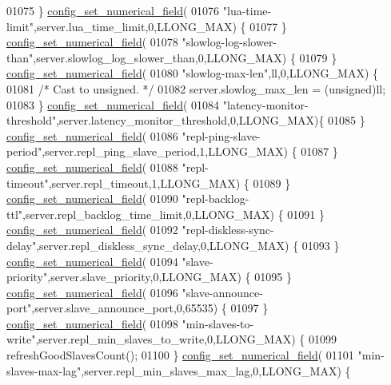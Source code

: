 \begin{DoxyCode}
{{{{{{{{01075     \} \hyperlink{config_8c_aba8f21b37a3e47952951cf4bd15ad296}{config\_set\_numerical\_field}(
01076       \textcolor{stringliteral}{"lua-time-limit"},server.lua\_time\_limit,0,LLONG\_MAX) \{
01077     \} \hyperlink{config_8c_aba8f21b37a3e47952951cf4bd15ad296}{config\_set\_numerical\_field}(
01078       \textcolor{stringliteral}{"slowlog-log-slower-than"},server.slowlog\_log\_slower\_than,0,LLONG\_MAX) \{
01079     \} \hyperlink{config_8c_aba8f21b37a3e47952951cf4bd15ad296}{config\_set\_numerical\_field}(
01080       \textcolor{stringliteral}{"slowlog-max-len"},ll,0,LLONG\_MAX) \{
01081       \textcolor{comment}{/* Cast to unsigned. */}
01082         server.slowlog\_max\_len = (\textcolor{keywordtype}{unsigned})ll;
01083     \} \hyperlink{config_8c_aba8f21b37a3e47952951cf4bd15ad296}{config\_set\_numerical\_field}(
01084       \textcolor{stringliteral}{"latency-monitor-threshold"},server.latency\_monitor\_threshold,0,LLONG\_MAX)\{
01085     \} \hyperlink{config_8c_aba8f21b37a3e47952951cf4bd15ad296}{config\_set\_numerical\_field}(
01086       \textcolor{stringliteral}{"repl-ping-slave-period"},server.repl\_ping\_slave\_period,1,LLONG\_MAX) \{
01087     \} \hyperlink{config_8c_aba8f21b37a3e47952951cf4bd15ad296}{config\_set\_numerical\_field}(
01088       \textcolor{stringliteral}{"repl-timeout"},server.repl\_timeout,1,LLONG\_MAX) \{
01089     \} \hyperlink{config_8c_aba8f21b37a3e47952951cf4bd15ad296}{config\_set\_numerical\_field}(
01090       \textcolor{stringliteral}{"repl-backlog-ttl"},server.repl\_backlog\_time\_limit,0,LLONG\_MAX) \{
01091     \} \hyperlink{config_8c_aba8f21b37a3e47952951cf4bd15ad296}{config\_set\_numerical\_field}(
01092       \textcolor{stringliteral}{"repl-diskless-sync-delay"},server.repl\_diskless\_sync\_delay,0,LLONG\_MAX) \{
01093     \} \hyperlink{config_8c_aba8f21b37a3e47952951cf4bd15ad296}{config\_set\_numerical\_field}(
01094       \textcolor{stringliteral}{"slave-priority"},server.slave\_priority,0,LLONG\_MAX) \{
01095     \} \hyperlink{config_8c_aba8f21b37a3e47952951cf4bd15ad296}{config\_set\_numerical\_field}(
01096       \textcolor{stringliteral}{"slave-announce-port"},server.slave\_announce\_port,0,65535) \{
01097     \} \hyperlink{config_8c_aba8f21b37a3e47952951cf4bd15ad296}{config\_set\_numerical\_field}(
01098       \textcolor{stringliteral}{"min-slaves-to-write"},server.repl\_min\_slaves\_to\_write,0,LLONG\_MAX) \{
01099         refreshGoodSlavesCount();
01100     \} \hyperlink{config_8c_aba8f21b37a3e47952951cf4bd15ad296}{config\_set\_numerical\_field}(
01101       \textcolor{stringliteral}{"min-slaves-max-lag"},server.repl\_min\_slaves\_max\_lag,0,LLONG\_MAX) \{
}}}}}}}}
\end{DoxyCode}
